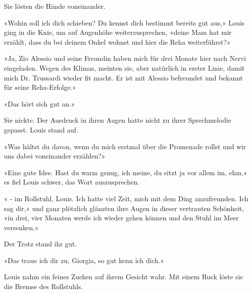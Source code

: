 Sie lösten die Hände voneinander.

«Wohin soll ich dich schieben? Du kennst dich bestimmt bereits gut aus,»
Louis ging in die Knie, um auf Augenhöhe weiterzusprechen, «deine Mam
hat mir erzählt, dass du bei deinem Onkel wohnst und hier die Reha
weiterführst?»

«Ja, Zio Alessio und seine Freundin haben mich für drei Monate hier nach
Nervi eingeladen. Wegen des Klimas, meinten sie, aber natürlich in erster Linie, 
damit mich Dr. Trussardi wieder fit macht. Er ist mit Alessio befreundet und bekannt für seine Reha-Erfolge.»

«Das hört sich gut an.»

Sie nickte. Der Ausdruck in ihren Augen hatte nicht zu ihrer
Sprechmelodie gepasst. Louis stand auf.

«Was hältst du davon, wenn du mich erstmal über die Promenade rollst und
wir uns dabei voneinander erzählen?»

«Eine gute Idee. Hast du warm genug, ich meine, du sitzt ja vor allem
im, ehm,» es fiel Louis schwer, das Wort auszusprechen.

« - im Rollstuhl, Louis. Ich hatte viel Zeit, mich mit dem Ding anzufreunden. Ich sag dir,» und ganz
plötzlich glänzten ihre Augen in dieser vertrauten Schönheit, «in drei, vier Monaten werde ich 
wieder gehen können und den Stuhl im Meer versenken.»

Der Trotz stand ihr gut.

«Das traue ich dir zu, Giorgia, so gut kenn ich dich.»

Louis nahm ein feines Zucken auf ihrem Gesicht wahr.
Mit einem Ruck löste sie die Bremse des Rollstuhls.
